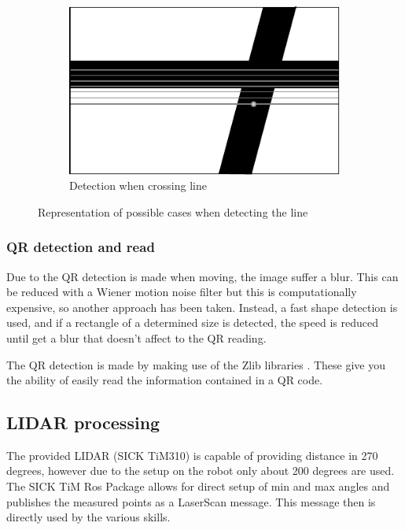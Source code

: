 \begin{figure}
\begin{subfigure}[ht!]{0.296\textwidth}
	            \includegraphics[width=\textwidth]{figs/mr_camera_processing_3}
	            \caption{Detection when crossing line}
	            \label{fig:mr_camera_processing_3}
	    	\end{subfigure}
	    \caption{Representation of possible cases when detecting the line}
	    \end{figure}

	\subsubsection{QR detection and read} %
	\label{ssub:qr_detection_and_read}
	Due to the QR detection is made when moving, the image suffer a blur.
	This can be reduced with a Wiener motion noise filter but this is computationally expensive, so another approach has been taken.
	Instead, a fast shape detection is used, and if a rectangle of a determined size is detected, the speed is reduced until get a blur that doesn't affect to the QR reading.

	The QR detection is made by making use of the Zlib libraries \cite{zlib}. 
	These give you the ability of easily read the information contained in a QR code.



	\subsection{LIDAR processing} %
	\label{sub:mr_lidar_processing}
	The provided LIDAR (SICK TiM310) is capable of providing distance in 270 degrees, however due to the setup on the robot only about 200 degrees are used. The SICK TiM Ros Package \cite{sick_tim} allows for direct setup of min and max angles and publishes the measured points as a LaserScan message. This message then is directly used by the various skills.

